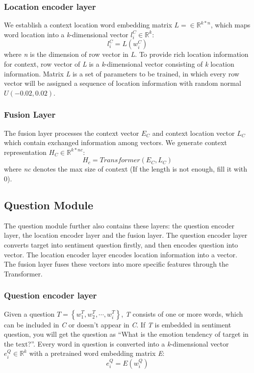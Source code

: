 \documentclass{ieeeaccess}
\begin{document}
\subsubsection{Location encoder layer}

We establish a context location word embedding matrix  $L = \in \mathbb{R}^{k\ast n}$, which maps word location into a \emph{k}-dimensional vector $l_i^C \in \mathbb{R}^k$:
\begin{equation}l_i^C = L(w_i^C)\end{equation}
where \emph{n} is the dimension of row vector in \emph{L}. To provide rich location information for context, row vector of \emph{L} is a \emph{k}-dimensional vector consisting of \emph{k} location information. Matrix \emph{L} is a set of parameters to be trained, in which every row vector will be assigned a sequence of location information with random normal $U\left(-0.02, 0.02\right)$.

\subsubsection{Fusion Layer}
The fusion layer processes the context vector $E_C$ and context location vector $L_C$ which contain exchanged information among vectors. We generate context representation $H_C \in \mathbb{R}^{k\ast nc}$:
\begin{equation}H_c = Transformer(E_C, L_C)\end{equation}
where \emph{nc} denotes the max size of context (If the length is not enough, fill it with 0).

\subsection{Question Module}
The question module further also contains these layers: the question encoder layer, the location encoder layer and the fusion layer. The question encoder layer converts target into sentiment question firstly, and then encodes question into vector. The location encoder layer encodes location information into a vector. The fusion layer fuses these vectors into more specific features through the Transformer.

\subsubsection{Question encoder layer}
Given a question $T = \left\{w_1^T, w_2^T, \cdots, w_i^T\right\}$,  \emph{T} consists of one or more words, which can be included in \emph{C} or doesn’t appear in \emph{C}. If \emph{T} is embedded in sentiment question, you will get the question as “What is the emotion tendency of target in the text?”. Every word in question is converted into a \emph{k}-dimensional vector $e_i^Q \in \mathbb{R}^k$ with a pretrained word embedding matrix \emph{E}:
\begin{equation}e_i^Q = E(w_i^Q)\end{equation}
\end{document}
